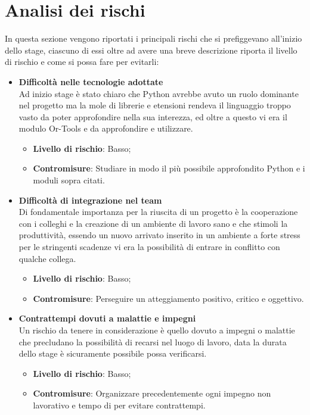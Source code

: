 \section{Analisi dei rischi}
In questa sezione vengono riportati i principali rischi che si prefiggevano all'inizio dello stage, ciascuno di essi oltre ad avere una breve descrizione riporta il livello di rischio e come si possa fare per evitarli:
\begin{itemize}
	\item \textbf{Difficoltà nelle tecnologie adottate}\\
	      Ad inizio stage è stato chiaro che Python avrebbe avuto un ruolo dominante nel progetto ma la mole di librerie e etensioni rendeva il linguaggio troppo vasto da poter approfondire nella sua interezza, ed oltre a questo vi era il modulo Or-Tools e  da approfondire e utilizzare.
	      \begin{itemize}
	      	\item \textbf{Livello di rischio}: Basso;
	      	\item \textbf{Contromisure}: Studiare in modo il più possibile approfondito Python e i moduli sopra citati.
	      \end{itemize}
	\item \textbf{Difficoltà di integrazione nel team}\\
	      Di fondamentale importanza per la riuscita di un progetto è la cooperazione con i colleghi e la creazione di un ambiente di lavoro sano e che stimoli la produttività, essendo un nuovo arrivato inserito in un ambiente a forte stress per le stringenti scadenze vi era la possibilità di entrare in conflitto con qualche collega.
	      \begin{itemize}
	      	\item \textbf{Livello di rischio}: Basso;
	      	\item \textbf{Contromisure}: Perseguire un atteggiamento positivo, critico e oggettivo.
	      \end{itemize}
	\item \textbf{Contrattempi dovuti a malattie e impegni}\\
	      Un rischio da tenere in considerazione è quello dovuto a impegni o malattie che precludano la possibilità di recarsi nel luogo di lavoro, data la durata dello stage è sicuramente possibile possa verificarsi.
	      \begin{itemize}
	      	\item \textbf{Livello di rischio}: Basso;
	      	\item \textbf{Contromisure}: Organizzare precedentemente ogni impegno non lavorativo e tempo di  per evitare contrattempi.

\end{itemize}
\end{itemize}
